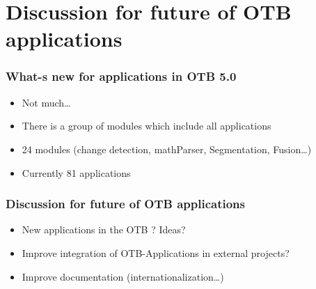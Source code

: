 \documentclass[8pt]{beamer}
\begin{document}
\section{Discussion for future of OTB applications}

\begin{frame}
\frametitle{What-s new for applications in OTB 5.0}
\begin{itemize}
\item Not much\ldots
\item There is a group of modules which include all applications
\item 24 modules (change detection, mathParser, Segmentation, Fusion\ldots)
\item Currently 81 applications
\end{itemize}
\end{frame}

\begin{frame}
\frametitle{Discussion for future of OTB applications}
\begin{itemize}
\item New applications in the OTB ? Ideas?  
\item Improve integration of OTB-Applications in external projects?
\item Improve documentation (internationalization\ldots)
\end{itemize}
\end{frame}
\end{document}
